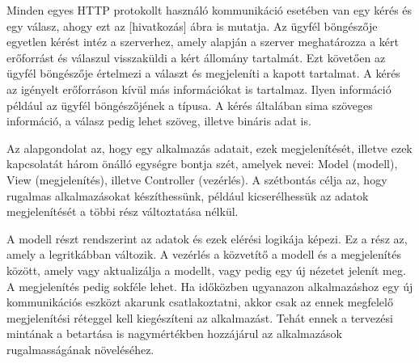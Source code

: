 Minden egyes HTTP protokollt használó kommunikáció esetében van egy kérés és egy válasz, ahogy ezt az [hivatkozás] ábra is mutatja. Az ügyfél böngészője egyetlen kérést intéz a szerverhez, amely alapján a szerver meghatározza a kért erőforrást és válaszul visszaküldi a kért állomány tartalmát. Ezt követően az ügyfél böngészője értelmezi a választ és megjeleníti a kapott tartalmat. A kérés az igényelt erőforráson kívül más információkat is tartalmaz. Ilyen információ például az ügyfél böngészőjének a típusa. A kérés általában sima szöveges információ, a válasz pedig lehet szöveg, illetve bináris adat is.

Az alapgondolat az, hogy egy alkalmazás adatait, ezek megjelenítését, illetve ezek kapcsolatát három önálló egységre bontja szét, amelyek nevei: Model (modell), View (megjelenítés), illetve Controller (vezérlés). A szétbontás célja az, hogy rugalmas alkalmazásokat készíthessünk, például kicserélhessük az adatok megjelenítését a többi rész változtatása nélkül.

A modell részt rendszerint az adatok és ezek elérési logikája képezi. Ez a rész az, amely a legritkábban változik. A vezérlés a közvetítő a modell és a megjelenítés között, amely vagy aktualizálja a modellt, vagy pedig egy új nézetet jelenít meg. A megjelenítés pedig sokféle lehet. Ha időközben ugyanazon alkalmazáshoz egy új kommunikációs eszközt akarunk csatlakoztatni, akkor csak az ennek megfelelő megjelenítési réteggel kell kiegészíteni az alkalmazást. Tehát ennek a tervezési mintának a betartása is nagymértékben hozzájárul az alkalmazások rugalmasságának növeléséhez.


